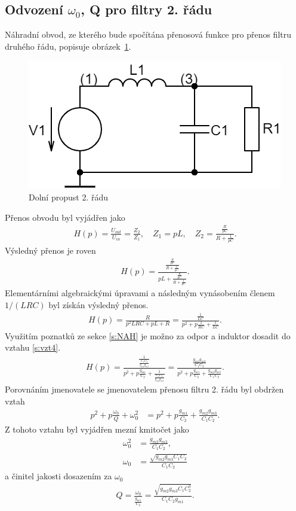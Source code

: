 \subsection{Odvození $\omega_0$, Q pro filtry 2. řádu}\label{s:ODV}
\noindent Náhradní obvod, ze kterého bude spočítána přenosová funkce pro přenos filtru druhého řádu, popisuje obrázek~\ref{s:DPO}.
\begin{figure}[h]
\centering
\includegraphics[scale=0.3]{circuit(1).png}
\caption{Dolní propust 2. řádu \label{s:DPO}} 
\end{figure}
\noindent Přenos obvodu byl vyjádřen jako
\begin{align}
H(p) = \frac{U_{out}}{U_{in}} = \frac{Z_2}{Z_1}, \quad Z_1 = pL,\quad Z_2 = \frac{\frac{R}{pC}}{R + \frac{1}{pC}}.
\end{align}
Výsledný přenos je roven 
\begin{align}
H(p) = \frac{\frac{\frac{R}{pC}}{R + \frac{1}{pC}}}{pL + \frac{\frac{R}{pC}}{R + \frac{1}{pC}}}.
\end{align}
Elementárními algebraickými úpravami a následným vynásobením členem $1/(LRC)$ byl získán výsledný přenos.
\begin{align}\label{s:vzt4}
H(p) = \frac{R}{p^2LRC + pL + R} = \frac{\frac{1}{LC}}{p^2 + p\frac{1}{RC} + \frac{1}{LC}}.
\end{align}
\noindent Využitím poznatků ze sekce \ref{s:NAH} je možno za odpor a induktor dosadit do vztahu \ref{s:vzt4}.
\begin{align}
H(p) = \frac{\frac{1}{\frac{C_1C_2}{g_{m2}g_{m3}}}}{p^2 + p\frac{g_{m1}}{C_2} + \frac{1}{\frac{C_1C_2}{g_{m2}g_{m3}}}} = \frac{\frac{g_{m2}g_{m3}}{C_1C_2}}{p^2 + p\frac{g_{m1}}{C_2} + \frac{g_{m2}g_{m3}}{C_1C_2}}.
\end{align}
Porovnáním jmenovatele se jmenovatelem přenosu filtru 2. řádu byl obdržen vztah
\begin{align}
p^2 + p\frac{\omega _0}{Q} + \omega _0^2 &= p^2 + p\frac{g_{m1}}{C_2} + \frac{g_{m2}g_{m3}}{C_1C_2}.
\end{align}
Z tohoto vztahu byl vyjádřen mezní kmitočet jako 
\begin{align}
\omega _0^2 &= \frac{g_{m2}g_{m3}}{C_1C_2}, \\
\omega _0 &= \frac{\sqrt{g_{m2}g_{m3}C_1C_2}}{C_1C_2}
\end{align}
a činitel jakosti dosazením za $\omega _0$
\begin{align}
Q = \frac{\omega _0}{\frac{g_{m1}}{C_2}} = \frac{\sqrt{g_{m2}g_{m3}C_1C_2^3}}{C_1C_2g_{m1}}.
\end{align}
